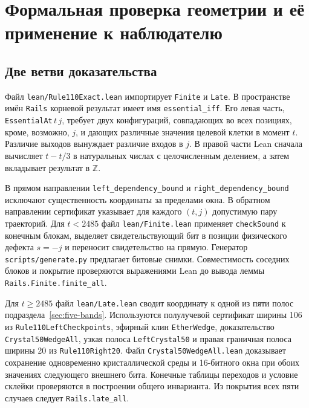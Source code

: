 \section{Формальная проверка геометрии и её применение к наблюдателю}\label{app:lean}

\subsection{Две ветви доказательства}
Файл \texttt{lean/Rule110Exact.lean} импортирует \texttt{Finite} и \texttt{Late}. В пространстве имён \texttt{Rails} корневой результат имеет имя \texttt{essential\_iff}. Его левая часть, \texttt{EssentialAt}\,$t\,j$, требует двух конфигураций, совпадающих во всех позициях, кроме, возможно, $j$, и дающих различные значения целевой клетки в момент $t$. Различие выходов вынуждает различие входов в $j$. В правой части Lean сначала вычисляет $t-t/3$ в натуральных числах с целочисленным делением, а затем вкладывает результат в $\mathbb Z$.

В прямом направлении \texttt{left\_dependency\_bound} и \texttt{right\_dependency\_bound} исключают существенность координаты за пределами окна. В обратном направлении сертификат указывает для каждого $(t,j)$ допустимую пару траекторий. Для $t<2485$ файл \texttt{lean/Finite.lean} применяет \texttt{checkSound} к конечным блокам, выделяет свидетельствующий бит в позиции физического дефекта $s=-j$ и переносит свидетельство на прямую. Генератор \texttt{scripts/generate.py} предлагает битовые снимки. Совместимость соседних блоков и покрытие проверяются выражениями Lean до вывода леммы \texttt{Rails.Finite.finite\_all}.

Для $t\ge2485$ файл \texttt{lean/Late.lean} сводит координату к одной из пяти полос подраздела~\ref{sec:five-bands}. Используются полулучевой сертификат ширины 106 из \texttt{Rule110LeftCheckpoints}, эфирный клин \texttt{EtherWedge}, доказательство \texttt{Crystal50WedgeAll}, узкая полоса \texttt{LeftCrystal50} и правая граничная полоса ширины 20 из \texttt{Rule110Right20}. Файл \texttt{Crystal50WedgeAll.lean} доказывает сохранение одновременно кристаллической среды и 16-битного окна при обоих значениях следующего внешнего бита. Конечные таблицы переходов и условие склейки проверяются в построении общего инварианта. Из покрытия всех пяти случаев следует \texttt{Rails.late\_all}.

